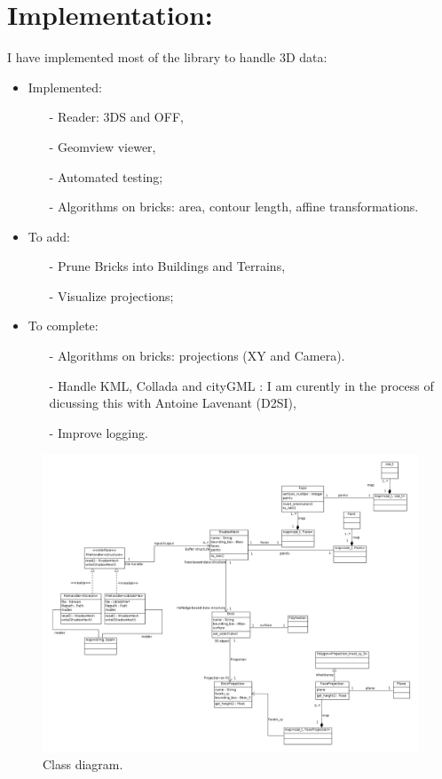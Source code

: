 \documentclass[a4paper, 11pt]{article}
\begin{document}
	\section*{Implementation:}
	I have implemented most of the library to handle 3D data:
	\begin{itemize}
		\item Implemented:
			\begin{itemize}
				\item[-] Reader: 3DS and OFF,
				\item[-] Geomview viewer,
				\item[-] Automated testing;
				\item[-] Algorithms on bricks: area, contour length, affine transformations.
			\end{itemize}
		\item To add:
			\begin{itemize}
				\item[-] Prune Bricks into Buildings and Terrains,
				\item[-] Visualize projections;
			\end{itemize}
		\item To complete:
			\begin{itemize}
				\item[-] Algorithms on bricks: projections (XY and Camera).
				\item[-] Handle KML, Collada and cityGML : I am curently in the process of dicussing this with Antoine Lavenant (D2SI),
				\item[-] Improve logging.
			\end{itemize}
	\end{itemize}
	
	\begin{figure}[H]
		\caption{\label{diag::class} Class diagram.}
		\includegraphics[scale=.3]{images/vectorial/class_diagram.png}
	\end{figure}
	
\end{document}

